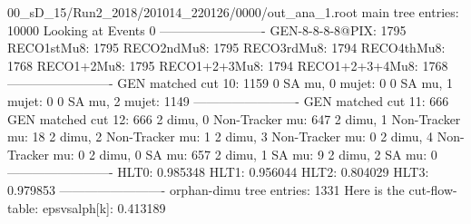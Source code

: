 00_sD_15/Run2_2018/201014_220126/0000/out_ana_1.root
main tree entries: 10000
Looking at Events 0
-------------------------
GEN-8-8-8-8@PIX: 1795
RECO1stMu8: 1795
RECO2ndMu8: 1795
RECO3rdMu8: 1794
RECO4thMu8: 1768
RECO1+2Mu8: 1795
RECO1+2+3Mu8: 1794
RECO1+2+3+4Mu8: 1768
-------------------------
GEN matched cut 10: 1159
0 SA mu, 0 mujet: 0
0 SA mu, 1 mujet: 0
0 SA mu, 2 mujet: 1149
-------------------------
GEN matched cut 11: 666
GEN matched cut 12: 666
2 dimu, 0 Non-Tracker mu: 647
2 dimu, 1 Non-Tracker mu: 18
2 dimu, 2 Non-Tracker mu: 1
2 dimu, 3 Non-Tracker mu: 0
2 dimu, 4 Non-Tracker mu: 0
2 dimu, 0 SA mu: 657
2 dimu, 1 SA mu: 9
2 dimu, 2 SA mu: 0
-------------------------
HLT0: 0.985348
HLT1: 0.956044
HLT2: 0.804029
HLT3: 0.979853
-------------------------
orphan-dimu tree entries: 1331
Here is the cut-flow-table:
epsvsalph[k]: 0.413189
        
